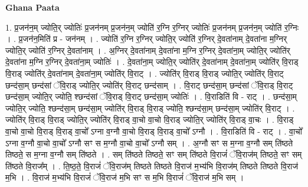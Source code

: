 \documentclass[17pt]{extarticle}
\begin{document}
\textbf{Ghana Paata } \newline

1. प्र॒जन॑न॒म् ज्योति॒र् ज्योतिः॑ प्र॒जन॑नम् प्र॒जन॑न॒म् ज्योति॑ र॒ग्नि र॒ग्निर् ज्योतिः॑ प्र॒जन॑नम् प्र॒जन॑न॒म् ज्योति॑ र॒ग्निः । . प्र॒जन॑न॒मिति॑ प्र - जन॑नम् । . ज्योति॑ र॒ग्नि र॒ग्निर् ज्योति॒र् ज्योति॑ र॒ग्निर् दे॒वता॑नाम् दे॒वता॑ना म॒ग्निर् ज्योति॒र् ज्योति॑ र॒ग्निर् दे॒वता॑नाम् । . अ॒ग्निर् दे॒वता॑नाम् दे॒वता॑ना म॒ग्नि र॒ग्निर् दे॒वता॑ना॒म् ज्योति॒र् ज्योति॑र् दे॒वता॑ना म॒ग्नि र॒ग्निर् दे॒वता॑ना॒म् ज्योतिः॑ । . दे॒वता॑ना॒म् ज्योति॒र् ज्योति॑र् दे॒वता॑नाम् दे॒वता॑ना॒म् ज्योति॑र् वि॒राड् वि॒राड् ज्योति॑र् दे॒वता॑नाम् दे॒वता॑ना॒म् ज्योति॑र् वि॒राट् । . ज्योति॑र् वि॒राड् वि॒राड् ज्योति॒र् ज्योति॑र् वि॒राट् छन्द॑सा॒म् छन्द॑सां ॅवि॒राड् ज्योति॒र् ज्योति॑र् वि॒राट् छन्द॑साम् । . वि॒राट् छन्द॑सा॒म् छन्द॑सां ॅवि॒राड् वि॒राट् छन्द॑सा॒म् ज्योति॒र् ज्योति॒ श्छन्द॑सां ॅवि॒राड् वि॒राट् छन्द॑सा॒म् ज्योतिः॑ । . वि॒राडिति॑ वि - राट् । . छन्द॑सा॒म् ज्योति॒र् ज्योति॒ श्छन्द॑सा॒म् छन्द॑सा॒म् ज्योति॑र् वि॒राड् वि॒राड् ज्योति॒ श्छन्द॑सा॒म् छन्द॑सा॒म् ज्योति॑र् वि॒राट् । . ज्योति॑र् वि॒राड् वि॒राड् ज्योति॒र् ज्योति॑र् वि॒राड् वा॒चो वा॒चो वि॒राड् ज्योति॒र् ज्योति॑र् वि॒राड् वा॒चः । . वि॒राड् वा॒चो वा॒चो वि॒राड् वि॒राड् वा॒चो᳚ ऽग्ना व॒ग्नौ वा॒चो वि॒राड् वि॒राड् वा॒चो᳚ ऽग्नौ । . वि॒राडिति॑ वि - राट् । . वा॒चो᳚ ऽग्ना व॒ग्नौ वा॒चो वा॒चो᳚ ऽग्नौ सꣳ स म॒ग्नौ वा॒चो वा॒चो᳚ ऽग्नौ सम् । . अ॒ग्नौ सꣳ स म॒ग्ना व॒ग्नौ सम् ति॑ष्ठते तिष्ठते॒ स म॒ग्ना व॒ग्नौ सम् ति॑ष्ठते । . सम् ति॑ष्ठते तिष्ठते॒ सꣳ सम् ति॑ष्ठते वि॒राजं॑ ॅवि॒राज॑म् तिष्ठते॒ सꣳ सम् ति॑ष्ठते वि॒राज᳚म् । . ति॒ष्ठ॒ते॒ वि॒राजं॑ ॅवि॒राज॑म् तिष्ठते तिष्ठते वि॒राज॑ म॒भ्य॑भि वि॒राज॑म् तिष्ठते तिष्ठते वि॒राज॑ म॒भि । . वि॒राज॑ म॒भ्य॑भि वि॒राजं॑ ॅवि॒राज॑ म॒भि सꣳ स म॒भि वि॒राजं॑ ॅवि॒राज॑ म॒भि सम् । \newline
\end{document}
